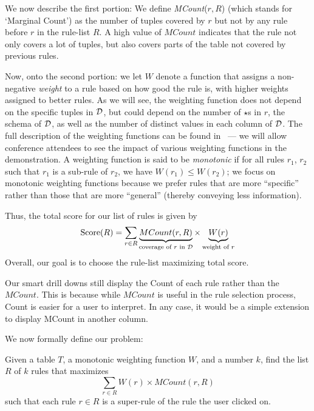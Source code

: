 We now describe the first portion:
We define {\em MCount}($r, R$) (which stands for `Marginal Count') as the number of tuples covered by $r$ but not by any rule before $r$ in the rule-list $R$. A high value of $MCount$ indicates that the rule not only covers a lot of tuples, but also covers parts of the table not covered by previous rules. 

Now, onto the second portion: we let $W$ denote a function that assigns a non-negative {\em weight} to a rule based on how good the rule is, with higher weights assigned to better rules. 
As we will see, the weighting function does not depend on the specific
tuples in $\mathcal{D}$, but could 
depend on the number of $\star$s in $r$,
the schema of $\mathcal{D}$, 
as well as the number of distinct values in each column of $\mathcal{D}$. The full description of the weighting functions
can be found in~\cite{tr} --- we will allow conference attendees to see the impact of various weighting functions
in the demonstration.
A weighting function is said to be {\em monotonic} if for all rules $r_1$, $r_2$ such that $r_1$ is a sub-rule of $r_2$, we have $W(r_1) \leq W(r_2)$; we focus
on monotonic weighting functions because we prefer 
rules that are more ``specific''
rather than those that are more ``general'' 
(thereby conveying less information). 

Thus, the total score for our list of rules is given by 
$$\text{Score}(R) = \sum_{r \in R} \underbrace{MCount(r, R)}_{\text{coverage of $r$ in $\mathcal{D}$}} \times \underbrace{W(r)}_{\text{weight of $r$}}$$ 
Overall, our goal is to choose the rule-list maximizing 
total score. 

Our smart drill downs still display the Count of each rule rather than the $MCount$. This is because while $MCount$ is useful in the rule selection process, Count is easier for a user to interpret. In any case, it would be a simple extension to display MCount in another column.

 We now formally define our problem:
\begin{problem}\label{prob:optimal-subrule-list}
Given a table $T$, a monotonic weighting function $W$, and a number $k$, find the list $R$ of $k$ rules that maximizes 
$$\sum_{r \in R} W(r) \times MCount(r,R)$$
such that each rule $r \in R$ is a super-rule of the rule the user clicked on.
\end{problem}
